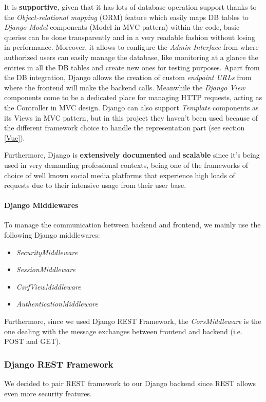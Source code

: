 \documentclass[table, 12pt]{article}
\begin{document}
It is \textbf{supportive}, given that it has lots of database operation support thanks to the \emph{Object-relational mapping} (ORM) feature which easily maps DB tables to \emph{Django Model} components (Model in MVC pattern) within the code, basic queries can be done transparently and in a very readable fashion without losing in performance.
Moreover, it allows to configure the \emph{Admin Interface} from where authorized users can easily manage the database, like monitoring at a glance the entries in all the DB tables and create new ones for testing purposes. Apart from the DB integration,  Django allows the creation of custom \emph{endpoint URLs} from where the frontend will make the backend calls. Meanwhile the \emph{Django View} components come to be a dedicated place for managing HTTP requests, acting as the Controller in MVC design. Django can also support \emph{Template} components as its Views in MVC pattern, but in this project they haven't been used because of the different framework choice to handle the representation part (see section \ref{Vue}).

Furthermore, Django is \textbf{extensively documented} and \textbf{scalable} since it's being used in very demanding professional contexts, being one of the frameworks of choice of well known social media platforms that experience high loads of requests due to their intensive usage from their user base.

\paragraph{Django Middlewares}
To manage the communication between backend and frontend, we mainly use the following Django middlewares:
\begin{itemize}
    \item \textit{SecurityMiddleware}
    \item \textit{SessionMiddleware}
    \item \textit{CsrfViewMiddleware}
    \item \textit{AuthenticationMiddleware}
\end{itemize}

Furthermore, since we used Django REST Framework, the \textit{CorsMiddleware} is the one dealing with the message exchanges between frontend and backend (i.e. POST and GET).

\subsubsection{Django REST Framework}
\label{REST}
We decided to pair REST framework to our Django backend since REST allows even more security features.
\end{document}
